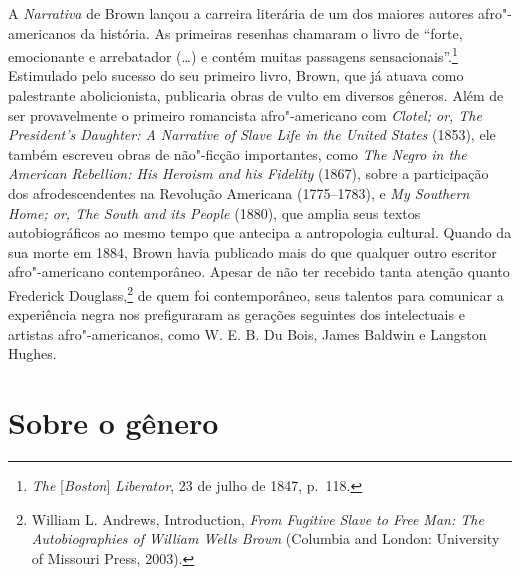 A \emph{Narrativa} de Brown
lançou a carreira literária de um dos maiores autores afro"-americanos da
história. As primeiras resenhas chamaram o livro de ``forte, emocionante
e arrebatador (\ldots{}) e contém muitas passagens sensacionais''.\footnote{\emph{The} {[}\emph{Boston}{]} \emph{Liberator}, 23 de julho de 1847, p.~118.} Estimulado
pelo sucesso do seu primeiro livro, Brown, que já atuava como
palestrante abolicionista, publicaria obras de vulto em diversos
gêneros. Além de ser provavelmente o primeiro romancista afro"-americano
com \emph{Clotel; or, The President's Daughter: A Narrative of Slave
Life in the United States} (1853), ele também escreveu obras de
não"-ficção importantes, como \emph{The Negro in the American Rebellion:
His Heroism and his Fidelity} (1867), sobre a participação dos
afrodescendentes na Revolução Americana (1775--1783), e \emph{My Southern
Home; or, The South and its People} (1880), que amplia seus textos
autobiográficos ao mesmo tempo que antecipa a antropologia cultural.
Quando da sua morte em 1884, Brown havia publicado mais do que qualquer
outro escritor afro"-americano contemporâneo. Apesar de não ter recebido
tanta atenção quanto Frederick Douglass,\footnote{William L. Andrews,
  Introduction, \emph{From Fugitive Slave to Free Man: The
  Autobiographies of William Wells Brown} (Columbia and London:
  University of Missouri Press, 2003).} de quem foi contemporâneo, seus
talentos para comunicar a experiência negra nos  prefiguraram as
gerações seguintes dos intelectuais e artistas afro"-americanos, como W.
E. B. Du Bois, James Baldwin e Langston Hughes.

\section{Sobre o gênero}

